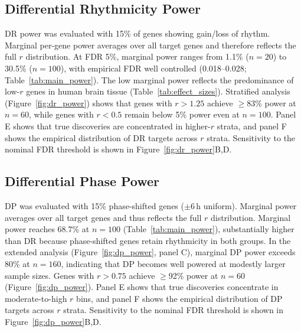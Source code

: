 \documentclass{article}
\begin{document}
\subsection{Differential Rhythmicity Power}

DR power was evaluated with 15\% of genes showing gain/loss of rhythm. Marginal per-gene power averages over all target genes and therefore reflects the full $r$ distribution. At FDR 5\%, marginal power ranges from 1.1\% ($n = 20$) to 30.5\% ($n = 100$), with empirical FDR well controlled (0.018--0.028; Table~\ref{tab:main_power}). The low marginal power reflects the predominance of low-$r$ genes in human brain tissue (Table~\ref{tab:effect_sizes}). Stratified analysis (Figure~\ref{fig:dr_power}) shows that genes with $r > 1.25$ achieve $\geq$83\% power at $n = 60$, while genes with $r < 0.5$ remain below 5\% power even at $n = 100$. Panel E shows that true discoveries are concentrated in higher-$r$ strata, and panel F shows the empirical distribution of DR targets across $r$ strata. Sensitivity to the nominal FDR threshold is shown in Figure~\ref{fig:dr_power}B,D.

\subsection{Differential Phase Power}

DP was evaluated with 15\% phase-shifted genes ($\pm$6\,h uniform). Marginal power averages over all target genes and thus reflects the full $r$ distribution. Marginal power reaches 68.7\% at $n = 100$ (Table~\ref{tab:main_power}), substantially higher than DR because phase-shifted genes retain rhythmicity in both groups. In the extended analysis (Figure~\ref{fig:dp_power}, panel C), marginal DP power exceeds 80\% at $n = 160$, indicating that DP becomes well powered at modestly larger sample sizes. Genes with $r > 0.75$ achieve $\geq$92\% power at $n = 60$ (Figure~\ref{fig:dp_power}). Panel E shows that true discoveries concentrate in moderate-to-high $r$ bins, and panel F shows the empirical distribution of DP targets across $r$ strata. Sensitivity to the nominal FDR threshold is shown in Figure~\ref{fig:dp_power}B,D.
\end{document}
